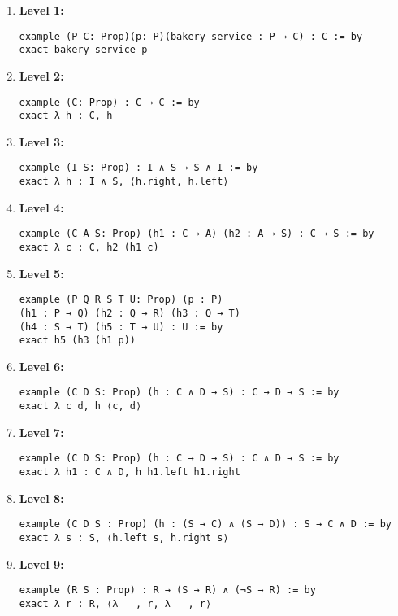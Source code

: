 \documentclass{article}
\begin{document}
\begin{enumerate}
    \item \textbf{Level 1:}
    \begin{lstlisting}[style=leanstyle]
example (P C: Prop)(p: P)(bakery_service : P → C) : C := by 
exact bakery_service p
    \end{lstlisting}

    \item \textbf{Level 2:}
    \begin{lstlisting}[style=leanstyle]
example (C: Prop) : C → C := by
exact λ h : C, h
    \end{lstlisting}

    \item \textbf{Level 3:}
    \begin{lstlisting}[style=leanstyle]
example (I S: Prop) : I ∧ S → S ∧ I := by
exact λ h : I ∧ S, ⟨h.right, h.left⟩
    \end{lstlisting}

    \item \textbf{Level 4:}
    \begin{lstlisting}[style=leanstyle]
example (C A S: Prop) (h1 : C → A) (h2 : A → S) : C → S := by
exact λ c : C, h2 (h1 c)
    \end{lstlisting}

    \item \textbf{Level 5:}
    \begin{lstlisting}[style=leanstyle]
example (P Q R S T U: Prop) (p : P)
(h1 : P → Q) (h2 : Q → R) (h3 : Q → T)
(h4 : S → T) (h5 : T → U) : U := by
exact h5 (h3 (h1 p))
    \end{lstlisting}

    \item \textbf{Level 6:}
    \begin{lstlisting}[style=leanstyle]
example (C D S: Prop) (h : C ∧ D → S) : C → D → S := by
exact λ c d, h ⟨c, d⟩
    \end{lstlisting}

    \item \textbf{Level 7:}
    \begin{lstlisting}[style=leanstyle]
example (C D S: Prop) (h : C → D → S) : C ∧ D → S := by
exact λ h1 : C ∧ D, h h1.left h1.right
    \end{lstlisting}

    \item \textbf{Level 8:}
    \begin{lstlisting}[style=leanstyle]
example (C D S : Prop) (h : (S → C) ∧ (S → D)) : S → C ∧ D := by
exact λ s : S, ⟨h.left s, h.right s⟩
    \end{lstlisting}

    \item \textbf{Level 9:}
    \begin{lstlisting}[style=leanstyle]
example (R S : Prop) : R → (S → R) ∧ (¬S → R) := by
exact λ r : R, ⟨λ _ , r, λ _ , r⟩
    \end{lstlisting}
\end{enumerate}
\end{document}
